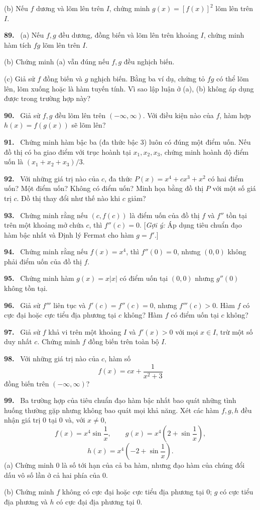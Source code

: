 \documentclass[12pt,a4paper]{article}
\newcommand{\bt}[1]{\par\smallskip\Needspace{5\baselineskip}\noindent\textbf{#1.}\ }
\begin{document}
(b) Nếu $f$ dương và lõm lên trên $I$, chứng minh $g(x)=[f(x)]^2$ lõm lên trên $I$.
\bt{89} (a) Nếu $f,g$ đều dương, đồng biến và lõm lên trên khoảng $I$, chứng minh hàm tích $fg$ lõm lên trên $I$.

(b) Chứng minh (a) vẫn đúng nếu $f,g$ đều nghịch biến.

(c) Giả sử $f$ đồng biến và $g$ nghịch biến. Bằng ba ví dụ, chứng tỏ $fg$ có thể lõm lên, lõm xuống hoặc là hàm tuyến tính. Vì sao lập luận ở (a), (b) không áp dụng được trong trường hợp này?
\bt{90} Giả sử $f,g$ đều lõm lên trên $(-\infty,\infty)$. Với điều kiện nào của $f$, hàm hợp $h(x)=f(g(x))$ sẽ lõm lên?
\bt{91} Chứng minh hàm bậc ba (đa thức bậc 3) luôn có đúng một điểm uốn. Nếu đồ thị có ba giao điểm với trục hoành tại $x_1,x_2,x_3$, chứng minh hoành độ điểm uốn là $(x_1+x_2+x_3)/3$.
\bt{92} Với những giá trị nào của $c$, đa thức $P(x)=x^4+cx^3+x^2$ có hai điểm uốn? Một điểm uốn? Không có điểm uốn? Minh họa bằng đồ thị $P$ với một số giá trị $c$. Đồ thị thay đổi như thế nào khi $c$ giảm?
\bt{93} Chứng minh rằng nếu $(c,f(c))$ là điểm uốn của đồ thị $f$ và $f''$ tồn tại trên một khoảng mở chứa $c$, thì $f''(c)=0$. [\textit{Gợi ý:} Áp dụng tiêu chuẩn đạo hàm bậc nhất và Định lý Fermat cho hàm $g=f'$.]
\bt{94} Chứng minh rằng nếu $f(x)=x^4$, thì $f''(0)=0$, nhưng $(0,0)$ không phải điểm uốn của đồ thị $f$.
\bt{95} Chứng minh hàm $g(x)=x|x|$ có điểm uốn tại $(0,0)$ nhưng $g''(0)$ không tồn tại.
\bt{96} Giả sử $f'''$ liên tục và $f'(c)=f''(c)=0$, nhưng $f'''(c)>0$. Hàm $f$ có cực đại hoặc cực tiểu địa phương tại $c$ không? Hàm $f$ có điểm uốn tại $c$ không?
\bt{97} Giả sử $f$ khả vi trên một khoảng $I$ và $f'(x)>0$ với mọi $x\in I$, trừ một số duy nhất $c$. Chứng minh $f$ đồng biến trên toàn bộ $I$.
\bt{98} Với những giá trị nào của $c$, hàm số
\[f(x)=cx+\frac1{x^2+3}\]
đồng biến trên $(-\infty,\infty)$?
\bt{99} Ba trường hợp của tiêu chuẩn đạo hàm bậc nhất bao quát những tình huống thường gặp nhưng không bao quát mọi khả năng. Xét các hàm $f,g,h$ đều nhận giá trị 0 tại 0 và, với $x\ne0$,
\[f(x)=x^4\sin\frac1x,\qquad g(x)=x^4\left(2+\sin\frac1x\right),\]
\[h(x)=x^4\left(-2+\sin\frac1x\right).\]
(a) Chứng minh 0 là số tới hạn của cả ba hàm, nhưng đạo hàm của chúng đổi dấu vô số lần ở cả hai phía của 0.

(b) Chứng minh $f$ không có cực đại hoặc cực tiểu địa phương tại 0; $g$ có cực tiểu địa phương và $h$ có cực đại địa phương tại 0.
\end{document}
